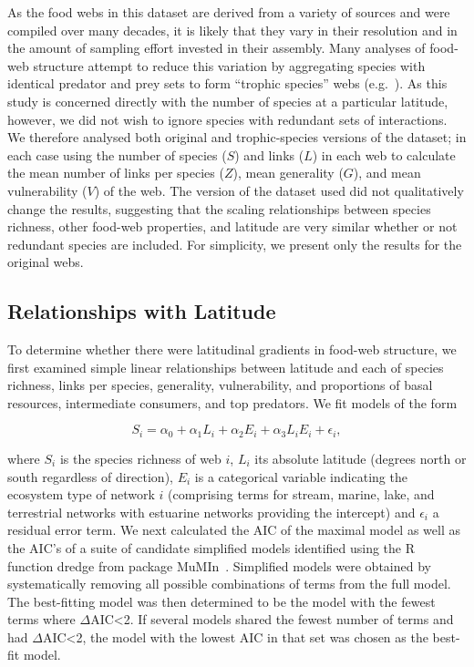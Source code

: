 \documentclass[12pt]{article}
\begin{document}
  As the food webs in this dataset are derived from a variety of sources and were compiled over many decades, it
  is likely that they vary in their resolution and in the amount of sampling effort invested in their assembly.
  Many analyses of food-web structure attempt to reduce this variation by aggregating species with identical predator and prey
  sets to form ``trophic species'' webs (e.g.~\citep{Martinez1991,Vermaat2009,Dunne2004,Dunne2013}). As this study
  is concerned directly with the number of species at a particular latitude, however, we did not wish to ignore 
  species with redundant sets of interactions. We therefore analysed both original and trophic-species versions
  of the dataset; in each case using the number of species ($S$) and 
  links ($L$) in each web to calculate the mean number of links per species ($Z$), mean generality 
  ($G$), and mean vulnerability ($V$) of the web. 
  The version of the dataset used did not qualitatively change the results, suggesting that
  the scaling relationships between species richness, other food-web properties, and latitude are very 
  similar whether or not redundant species are included. For simplicity, we present only
  the results for the original webs.


\subsection*{Relationships with Latitude}

  To determine whether there were latitudinal gradients in food-web structure,
  we first examined simple linear relationships between latitude and each of 
  species richness, links per species, generality, vulnerability, and proportions
  of basal resources, intermediate consumers, and top predators. We fit models of the form

  \begin{equation}
  \label{Latfull}
  S_{i} = \alpha_{0} + \alpha_{1} L_{i} + \alpha_{2} E_{i} + \alpha_{3} L_{i} E_{i} + \epsilon_{i} ,
  \end{equation}

  \noindent where $S_{i}$ is the species richness of web $i$, $L_{i}$ its absolute
  latitude (degrees north or south  regardless of direction), $E_{i}$ is a categorical
  variable indicating the ecosystem type of network $i$ (comprising terms for stream, 
  marine, lake, and terrestrial networks with estuarine
  networks providing the intercept) and $\epsilon_{i}$ a residual error term. 
  We next calculated the AIC
  of the maximal model as well as the AIC's of a suite of candidate simplified models identified
  using the R~\citep{R} function dredge from package MuMIn~\citep{MuMIn}. 
  Simplified models were obtained by
  systematically removing all possible combinations of terms from the full model.
  The best-fitting model was then determined to be the model with the fewest terms 
  where $\Delta$AIC\textless2. If several models shared the fewest number of terms 
  and had $\Delta$AIC\textless2, the model with the lowest AIC in that set was chosen as the best-fit
  model.
\end{document}

